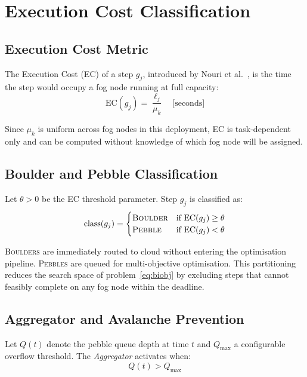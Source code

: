 \documentclass[12pt,a4paper]{article}
\theoremstyle{definition}
\theoremstyle{remark}
\begin{document}
\section{Execution Cost Classification}
\label{sec:tof}

\subsection{Execution Cost Metric}

The Execution Cost (EC) of a step $g_j$, introduced by Nouri et al.~\cite{nouri2024tof},
is the time the step would occupy a fog node running at full capacity:
\begin{equation}
  \mathrm{EC}(g_j) = \frac{\ell_j}{\mu_k} \quad \text{[seconds]}
  \label{eq:ec}
\end{equation}

Since $\mu_k$ is uniform across fog nodes in this deployment, EC is
task-dependent only and can be computed without knowledge of which fog node
will be assigned.

\subsection{Boulder and Pebble Classification}

Let $\theta > 0$ be the EC threshold parameter. Step $g_j$ is classified as:
\begin{equation}
  \mathrm{class}(g_j) =
  \begin{cases}
    \textsc{Boulder} & \text{if } \mathrm{EC}(g_j) \geq \theta \\
    \textsc{Pebble}  & \text{if } \mathrm{EC}(g_j) < \theta
  \end{cases}
  \label{eq:classification}
\end{equation}

\textsc{Boulders} are immediately routed to cloud without entering the
optimisation pipeline. \textsc{Pebbles} are queued for multi-objective
optimisation. This partitioning reduces the search space of
problem~\eqref{eq:biobj} by excluding steps that cannot feasibly complete on
any fog node within the deadline.

\subsection{Aggregator and Avalanche Prevention}

Let $Q(t)$ denote the pebble queue depth at time $t$ and $Q_{\max}$ a
configurable overflow threshold. The \emph{Aggregator} activates when:
\begin{equation}
  Q(t) > Q_{\max}
  \label{eq:aggregator_trigger}
\end{equation}
\end{document}
